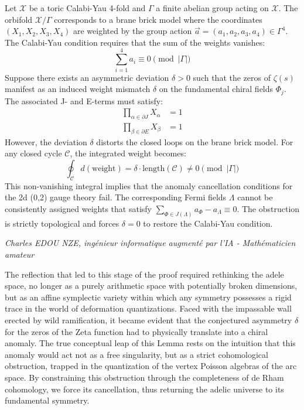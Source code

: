 \documentclass[
]{article}
\begin{document}
Let $\mathcal{X}$ be a toric Calabi-Yau 4-fold and $\Gamma$ a finite abelian group acting on $\mathcal{X}$. The orbifold $\mathcal{X}/\Gamma$ corresponds to a brane brick model where the coordinates $(X_1, X_2, X_3, X_4)$ are weighted by the group action $\vec{a} = (a_1, a_2, a_3, a_4) \in \Gamma^4$. The Calabi-Yau condition requires that the sum of the weights vanishes:
\begin{equation*}
\sum_{i=1}^4 a_i \equiv 0 \pmod{|\Gamma|}
\end{equation*}
Suppose there exists an asymmetric deviation $\delta > 0$ such that the zeros of $\zeta(s)$ manifest as an induced weight mismatch $\delta$ on the fundamental chiral fields $\Phi_j$. The associated J- and E-terms must satisfy:
\begin{align*}
\prod_{\alpha \in \partial J} X_\alpha &= 1 \\
\prod_{\beta \in \partial E} X_\beta &= 1
\end{align*}
However, the deviation $\delta$ distorts the closed loops on the brane brick model. For any closed cycle $\mathcal{C}$, the integrated weight becomes:
\begin{equation*}
\oint_{\mathcal{C}} d(\text{weight}) = \delta \cdot \text{length}(\mathcal{C}) \neq 0 \pmod{|\Gamma|}
\end{equation*}
This non-vanishing integral implies that the anomaly cancellation conditions for the 2d (0,2) gauge theory fail. The corresponding Fermi fields $\Lambda$ cannot be consistently assigned weights that satisfy $\sum_{\Phi \in J(\Lambda)} a_\Phi - a_\Lambda \equiv 0$. The obstruction is strictly topological and forces $\delta = 0$ to restore the Calabi-Yau condition.

\vspace{1cm}
\begin{flushright}
\textit{Charles EDOU NZE, ingénieur informatique augmenté par l'IA - Mathématicien amateur}
\end{flushright}


The reflection that led to this stage of the proof required rethinking the adele space, no longer as a purely arithmetic space with potentially broken dimensions, but as an affine symplectic variety within which any symmetry possesses a rigid trace in the world of deformation quantizations. Faced with the impassable wall erected by wild ramification, it became evident that the conjectured asymmetry $\delta$ for the zeros of the Zeta function had to physically translate into a chiral anomaly. The true conceptual leap of this Lemma rests on the intuition that this anomaly would act not as a free singularity, but as a strict cohomological obstruction, trapped in the quantization of the vertex Poisson algebras of the arc space. By constraining this obstruction through the completeness of de Rham cohomology, we force its cancellation, thus returning the adelic universe to its fundamental symmetry.
\end{document}
